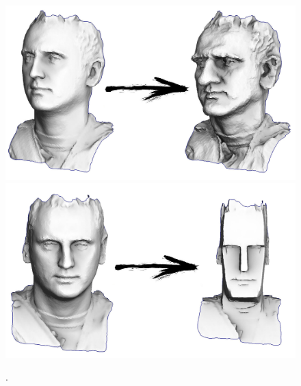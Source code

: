 \documentclass[notitlepage]{report}
\begin{document}
\begin{figure}[ht]
	\centering
    \includegraphics[width=.8\linewidth]{caricature.jpg}
	\includegraphics[width=.8\linewidth]{cubify.jpg}
	\caption{.}
	\label{fig:????}
\end{figure}
\end{document}
